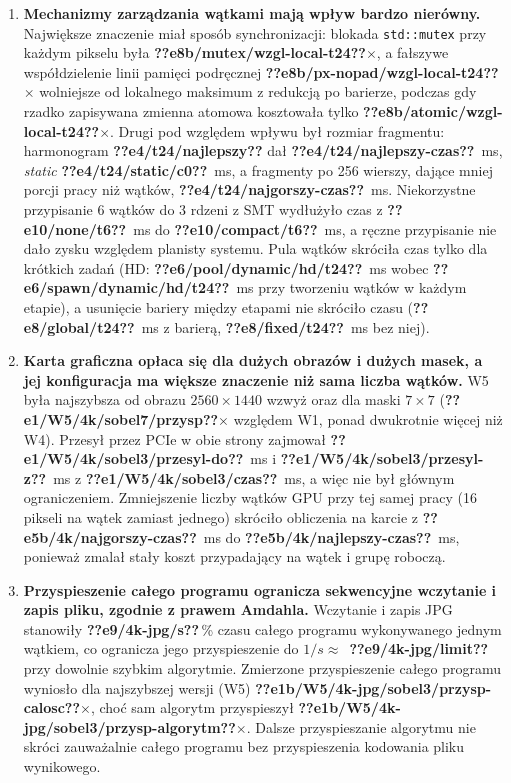 \documentclass[12pt,a4paper]{article}
\providecommand{\wynik}[1]{\textbf{??#1??}}
\newcommand{\kod}[1]{\texttt{#1}}
\begin{document}
\begin{enumerate}
	\item \textbf{Mechanizmy zarządzania wątkami mają wpływ bardzo nierówny.} Największe znaczenie miał sposób synchronizacji: blokada \kod{std::mutex} przy każdym pikselu była \wynik{e8b/mutex/wzgl-local-t24}$\times$, a fałszywe współdzielenie linii pamięci podręcznej \wynik{e8b/px-nopad/wzgl-local-t24}$\times$ wolniejsze od lokalnego maksimum z redukcją po barierze, podczas gdy rzadko zapisywana zmienna atomowa kosztowała tylko \wynik{e8b/atomic/wzgl-local-t24}$\times$. Drugi pod względem wpływu był rozmiar fragmentu: harmonogram \wynik{e4/t24/najlepszy} dał \wynik{e4/t24/najlepszy-czas}~ms, \emph{static} \wynik{e4/t24/static/c0}~ms, a fragmenty po 256 wierszy, dające mniej porcji pracy niż wątków, \wynik{e4/t24/najgorszy-czas}~ms. Niekorzystne przypisanie 6 wątków do 3 rdzeni z SMT wydłużyło czas z \wynik{e10/none/t6}~ms do \wynik{e10/compact/t6}~ms, a ręczne przypisanie nie dało zysku względem planisty systemu. Pula wątków skróciła czas tylko dla krótkich zadań (HD: \wynik{e6/pool/dynamic/hd/t24}~ms wobec \wynik{e6/spawn/dynamic/hd/t24}~ms przy tworzeniu wątków w każdym etapie), a usunięcie bariery między etapami nie skróciło czasu (\wynik{e8/global/t24}~ms z barierą, \wynik{e8/fixed/t24}~ms bez niej).

	\item \textbf{Karta graficzna opłaca się dla dużych obrazów i dużych masek, a jej konfiguracja ma większe znaczenie niż sama liczba wątków.} W5 była najszybsza od obrazu $2560\times1440$ wzwyż oraz dla maski $7\times7$ (\wynik{e1/W5/4k/sobel7/przysp}$\times$ względem W1, ponad dwukrotnie więcej niż W4). Przesył przez PCIe w obie strony zajmował \wynik{e1/W5/4k/sobel3/przesyl-do}~ms i \wynik{e1/W5/4k/sobel3/przesyl-z}~ms z \wynik{e1/W5/4k/sobel3/czas}~ms, a więc nie był głównym ograniczeniem. Zmniejszenie liczby wątków GPU przy tej samej pracy (16 pikseli na wątek zamiast jednego) skróciło obliczenia na karcie z \wynik{e5b/4k/najgorszy-czas}~ms do \wynik{e5b/4k/najlepszy-czas}~ms, ponieważ zmalał stały koszt przypadający na wątek i grupę roboczą.

	\item \textbf{Przyspieszenie całego programu ogranicza sekwencyjne wczytanie i zapis pliku, zgodnie z prawem Amdahla.} Wczytanie i zapis JPG stanowiły \wynik{e9/4k-jpg/s}\,\% czasu całego programu wykonywanego jednym wątkiem, co ogranicza jego przyspieszenie do $1/s \approx$~\wynik{e9/4k-jpg/limit} przy dowolnie szybkim algorytmie. Zmierzone przyspieszenie całego programu wyniosło dla najszybszej wersji (W5) \wynik{e1b/W5/4k-jpg/sobel3/przysp-calosc}$\times$, choć sam algorytm przyspieszył \wynik{e1b/W5/4k-jpg/sobel3/przysp-algorytm}$\times$. Dalsze przyspieszanie algorytmu nie skróci zauważalnie całego programu bez przyspieszenia kodowania pliku wynikowego.


\end{enumerate}
\end{document}
